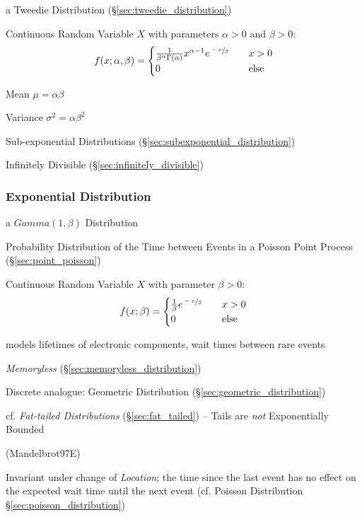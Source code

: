 a Tweedie Distribution (\S\ref{sec:tweedie_distribution})

Continuous Random Variable $X$ with parameters $\alpha > 0$ and
$\beta > 0$:
\[
  f(x; \alpha, \beta) =
  \begin{cases}
    \frac{1}{\beta^\alpha \Gamma(\alpha)} x^{\alpha-1} e^{\sfrac{-x}{\beta}}
      & \quad x > 0 \\
    0 & \quad\text{else} \\
  \end{cases}
\]

Mean $\mu = \alpha \beta$

Variance $\sigma^2 = \alpha \beta^2$

Sub-exponential Distributions (\S\ref{sec:subexponential_distribution})

Infinitely Divisible (\S\ref{sec:infinitely_divisible})



\subsubsection{Exponential Distribution}\label{sec:exponential_distribution}

a $Gamma(1, \beta)$ Distribution

Probability Distribution of the Time between Events in a Poisson Point Process
(\S\ref{sec:point_poisson})

Continuous Random Variable $X$ with parameter $\beta > 0$:
\[
  f(x; \beta) =
  \begin{cases}
  \frac{1}{\beta} e^{\sfrac{-x}{\beta}}     & \quad x > 0 \\
  0     & \quad\text{else} \\
  \end{cases}
\]

models lifetimes of electronic components, wait times between rare events

\emph{Memoryless} (\S\ref{sec:memoryless_distribution})

\fist Discrete analogue: Geometric Distribution
(\S\ref{sec:geometric_distribution})

cf. \emph{Fat-tailed Distributions} (\S\ref{sec:fat_tailed}) -- Tails are
\emph{not} Exponentially Bounded

(Mandelbrot97E)

Invariant under change of \emph{Location}; the time since the last event has no
effect on the expected wait time until the next event (cf. Poisson Distribution
\S\ref{sec:poisson_distribution})

